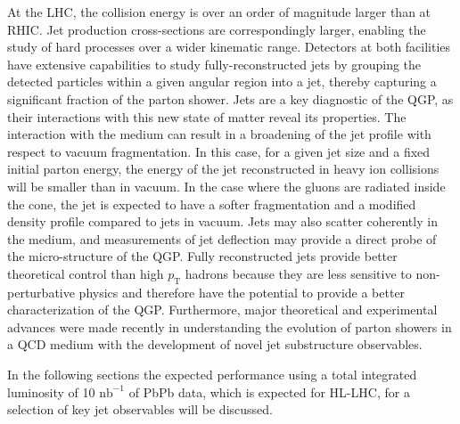 At the LHC, the collision energy is over an order of magnitude larger than at RHIC. Jet production cross-sections are correspondingly larger, enabling the study of hard processes over a wider kinematic range. Detectors at both facilities have extensive capabilities to study fully-reconstructed jets by grouping the detected particles within a given angular region into a jet, thereby capturing a significant fraction of the parton shower. Jets are a key diagnostic of the QGP, as their interactions with this new state of matter reveal its properties. The interaction with the medium can result in a broadening of the jet profile with respect to vacuum fragmentation. In this case, for a given jet size and a fixed initial parton energy, the energy of the jet reconstructed in heavy ion collisions will be smaller than in vacuum. In the case where the gluons are radiated inside the cone, the jet is expected to have a softer fragmentation and a modified density profile compared to jets in vacuum. Jets may also scatter coherently in the medium, and measurements of jet deflection may provide a direct probe of the micro-structure of the QGP. Fully reconstructed jets provide better theoretical control than high $p_{\mathrm{T}}$ hadrons because they are less sensitive to non-perturbative physics and therefore have the potential to provide a better characterization of the QGP. 
Furthermore, major theoretical and experimental advances were made recently in understanding the evolution of parton showers in a QCD medium with the development of novel jet substructure observables.

In the following sections the expected performance using a total integrated luminosity of 10 $\mathrm{nb}^{-1}$ of PbPb data, which is expected for HL-LHC, for a selection of key jet observables will be discussed. %

